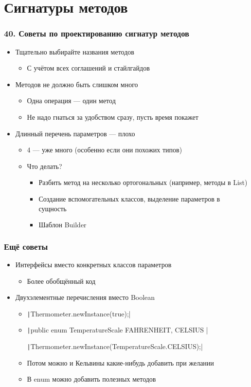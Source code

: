 \documentclass[xetex,mathserif,serif]{beamer}
\begin{document}
	\section{Сигнатуры методов}

	\begin{frame}
		\frametitle{40. Советы по проектированию сигнатур методов}
		\begin{itemize}
			\item Тщательно выбирайте названия методов
			\begin{itemize}
				\item С учётом всех соглашений и стайлгайдов
			\end{itemize}
			\item Методов не должно быть слишком много
			\begin{itemize}
				\item Одна операция --- один метод
				\item Не надо гнаться за удобством сразу, пусть время покажет
			\end{itemize}
			\item Длинный перечень параметров --- плохо
			\begin{itemize}
				\item 4 --- уже много (особенно если они похожих типов)
				\item Что делать?
				\begin{itemize}
					\item Разбить метод на несколько ортогональных (например, методы в List)
					\item Создание вспомогательных классов, выделение параметров в сущность
					\item Шаблон Builder
				\end{itemize}
			\end{itemize}
		\end{itemize}
	\end{frame}

	\begin{frame}
		\frametitle{Ещё советы}
		\begin{itemize}
			\item Интерфейсы вместо конкретных классов параметров
			\begin{itemize}
				\item Более обобщённый код
			\end{itemize}
			\item Двухэлементные перечисления вместо Boolean
			\begin{itemize}
				\item \texttt|Thermometer.newInstance(true);|
				\item \texttt|public enum TemperatureScale { FAHRENHEIT, CELSIUS }|
				
					\texttt|Thermometer.newInstance(TemperatureScale.CELSIUS);|
				\item Потом можно и Кельвины какие-нибудь добавить при желании
				\item В enum можно добавить полезных методов
			\end{itemize}
		\end{itemize}
	\end{frame}
\end{document}
